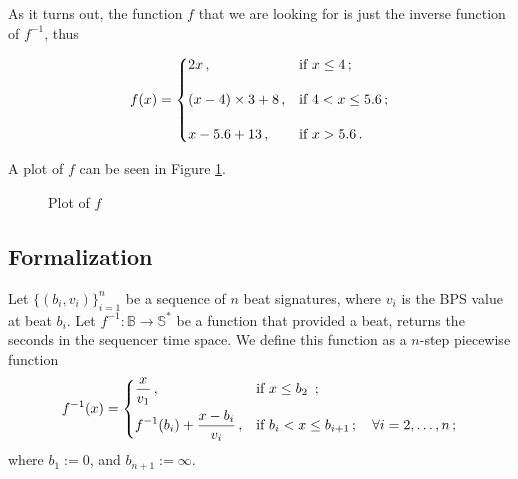 \documentclass[a4paper,9pt]{article}
\begin{document}
As it turns out, the function $f$ that we are looking for is just the inverse function of $f^{-1}$, thus

    \begin{equation}
    f(x) = \begin{dcases}
		    2x\,, & \text{if $x \leq 4\,;$}\\[1em]
		    (x-4)\times 3 + 8\,, & \text{if $4 < x \leq 5.6\,;$}\\[1em]  
		    x-5.6 + 13\,, & \text{if $x > 5.6\,.$}\\ 
	    \end{dcases}
	    \label{eq:beat2second}
    \end{equation}
    
    A plot of $f$ can be seen in Figure \ref{fig:second2beat}.
\begin{figure}[htpb]
	\centering

	\caption{Plot of $f$}
	\label{fig:second2beat}
\end{figure}

\subsection{Formalization}
Let $\{\left( b_i, v_i \right)\}_{i=1}^{n}$ be a sequence of $n$ beat signatures, where $v_i$ is the BPS  value at beat $b_i$. 
Let $ f^{-1}: \mathbb{B} \rightarrow \mathbb{S^{*}} $ be a function that provided a beat, returns the seconds in the sequencer time space. We define this function as a $n$-step piecewise function
    \begin{equation}
	    f^{-1}(x) = \begin{dcases}
		    \frac{x}{v_1}\,, & \text{if $x \leq b_{2} $ }\,;\\
		    f^{-1}(b_{i}) + \frac{x-b_{i}}{v_i}\,, & \text{if $b_{i} < x \leq b_{i+1}\,; \quad \forall i=2,\ldots,n $}\,; \\
	    \end{dcases}
	    \label{eq:beat2second}
    \end{equation}
    where $ b_1 := 0$,  and $b_{n+1} := \infty$.
    
\end{document}
